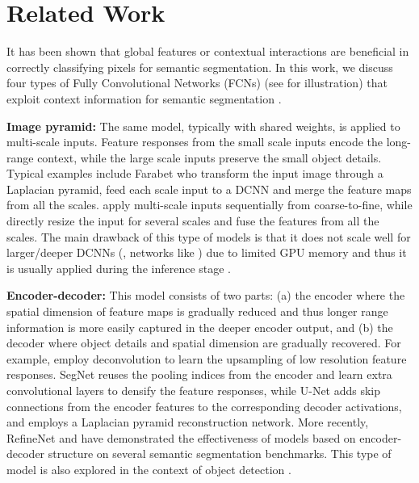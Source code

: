 \section{Related Work}
It has been shown that global features or contextual interactions \cite{he2004multiscale,shotton2009textonboost,kohli2009robust,ladicky2009associative,gould2009decomposing,yao2012describing} are beneficial in correctly classifying pixels for semantic segmentation. In this work, we discuss four types of Fully Convolutional Networks (FCNs) \cite{sermanet2013overfeat, long2014fully} (see  for illustration) that exploit context information for semantic segmentation \cite{hariharan2014hypercolumns, dai2014convolutional, mostajabi2014feedforward, chen2015semantic, zheng2015conditional, lin2015efficient, papandreou2015weakly, schwing2015fully, xia2015zoom}.

\textbf{Image pyramid:} The same model, typically with shared weights, is applied to multi-scale inputs. Feature responses from the small scale inputs encode the long-range context, while the large scale inputs preserve the small object details. Typical examples include Farabet \etal \cite{farabet2013learning} who transform the input image through a Laplacian pyramid, feed each scale input to a DCNN and merge the feature maps from all the scales. \cite{eigen2014predicting, pinheiro2014recurrent} apply multi-scale inputs sequentially from coarse-to-fine, while \cite{lin2015efficient,chen2015attention,chen2016deeplab} directly resize the input for several scales and fuse the features from all the scales. The main drawback of this type of models is that it does not scale well for larger/deeper DCNNs (\eg, networks like \cite{he2015deep,zagoruyko2016wide,wu2016wider}) due to limited GPU memory and thus it is usually applied during the inference stage \cite{dai2015boxsup}.

\textbf{Encoder-decoder:} This model consists of two parts: (a) the encoder where the spatial dimension of feature maps is gradually reduced and thus longer range information is more easily captured in the deeper encoder output, and (b) the decoder where object details and spatial dimension are gradually recovered. For example, \cite{long2014fully,noh2015learning} employ deconvolution \cite{zeiler2011adaptive} to learn the upsampling of low resolution feature responses. SegNet \cite{badrinarayanan2015segnet} reuses the pooling indices from the encoder and learn extra convolutional layers to densify the feature responses, while U-Net \cite{ronneberger2015u} adds skip connections from the encoder features to the corresponding decoder activations, and \cite{ghiasi2016laplacian} employs a Laplacian pyramid reconstruction network. More recently, RefineNet \cite{lin2016refinenet} and \cite{pohlen2016full, peng2017large, islamgated} have demonstrated the effectiveness of models based on encoder-decoder structure on several semantic segmentation benchmarks. This type of model is also explored in the context of object detection \cite{lin2016feature,shrivastava2016beyond}.

